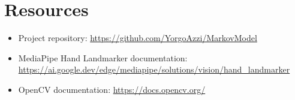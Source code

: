 \documentclass[11pt,a4paper]{article}
\begin{document}
\section{Resources}

\begin{itemize}
    \item Project repository:
    \url{https://github.com/YorgoAzzi/MarkovModel}
    \item MediaPipe Hand Landmarker documentation:
    \url{https://ai.google.dev/edge/mediapipe/solutions/vision/hand_landmarker}
    \item OpenCV documentation:
    \url{https://docs.opencv.org/}
\end{itemize}
\end{document}
